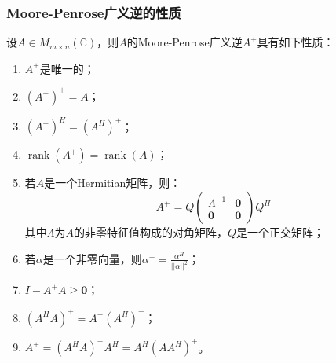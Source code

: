 \subsubsection{Moore-Penrose广义逆的性质}
\begin{property}\label{prop:A+}
	设$A\in M_{m\times n}(\mathbb{C})$，则$A$的Moore-Penrose广义逆$A^+$具有如下性质：
	\begin{enumerate}
		\item $A^+$是唯一的；
		\item $(A^+)^+=A$；
		\item $(A^+)^H=(A^H)^+$；
		\item $\operatorname{rank}(A^+)=\operatorname{rank}(A)$；
		\item 若$A$是一个Hermitian矩阵，则：
		\begin{equation*}
			A^+=Q
			\begin{pmatrix}
				\varLambda^{-1} & \mathbf{0} \\
				\mathbf{0} & \mathbf{0}
			\end{pmatrix}Q^H
		\end{equation*}
		其中$\varLambda$为$A$的非零特征值构成的对角矩阵，$Q$是一个正交矩阵；
		\item 若$\alpha$是一个非零向量，则$\alpha^+=\frac{\alpha^H}{||\alpha||^2}$；
		\item $I-A^+A\geqslant \mathbf{0}$；
		\item $(A^HA)^+=A^+(A^H)^+$；
		\item $A^+=(A^HA)^+A^H=A^H(AA^H)^+$。
	\end{enumerate}
\end{property}
